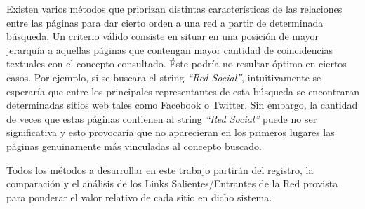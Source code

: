 \documentclass[a4paper]{article}
\begin{document}
Existen varios m\'etodos que priorizan distintas caracter\'isticas de las relaciones entre las p\'aginas para dar cierto orden a una red a partir de determinada b\'usqueda. Un criterio v\'alido consiste en situar en una posici\'on de mayor jerarqu\'ia a aquellas p\'aginas que contengan mayor cantidad de coincidencias textuales con el concepto consultado. \'Este podr\'ia no resultar \'optimo en ciertos casos. Por ejemplo, si se buscara el string \textit{``Red Social''}, intuitivamente se esperar\'ia que entre los principales representantes de esta b\'usqueda se encontraran determinadas sitios web tales como Facebook o Twitter. Sin embargo, la cantidad de veces que estas p\'aginas contienen al string \textit{``Red Social''} puede no ser significativa y esto provocar\'ia que no aparecieran en los primeros lugares las p\'aginas genuinamente m\'as vinculadas al concepto buscado.

Todos los m\'etodos a desarrollar en este trabajo partir\'an del registro, la comparaci\'on y el an\'alisis de los Links Salientes/Entrantes  de la Red provista para ponderar el valor relativo de cada sitio en dicho sistema.
\\
\end{document}
